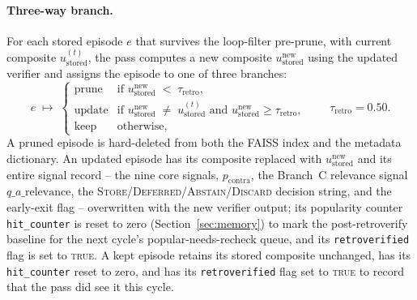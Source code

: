 \paragraph{Three-way branch.}
For each stored episode $e$ that survives the loop-filter pre-prune, with current composite $u_{\text{stored}}^{(t)}$, the pass computes a new composite $u_{\text{stored}}^{\text{new}}$ using the updated verifier and assigns the episode to one of three branches:
\begin{equation}
e \;\longmapsto\;
\begin{cases}
\text{prune} & \text{if } u_{\text{stored}}^{\text{new}} \;<\; \tau_{\text{retro}}, \\[3pt]
\text{update} & \text{if } u_{\text{stored}}^{\text{new}} \;\neq\; u_{\text{stored}}^{(t)} \text{ and } u_{\text{stored}}^{\text{new}} \geq \tau_{\text{retro}}, \\[3pt]
\text{keep} & \text{otherwise},
\end{cases}
\qquad \tau_{\text{retro}} = 0.50.
\label{eq:retro-branch}
\end{equation}
A pruned episode is hard-deleted from both the FAISS index and the metadata dictionary. An updated episode has its composite replaced with $u_{\text{stored}}^{\text{new}}$ and its entire signal record -- the nine core signals, $p_{\text{contra}}$, the Branch~C relevance signal $q\_a\_\text{relevance}$, the \textsc{Store}/\textsc{Deferred}/\textsc{Abstain}/\textsc{Discard} decision string, and the early-exit flag -- overwritten with the new verifier output; its popularity counter \texttt{hit\_counter} is reset to zero (Section~\ref{sec:memory}) to mark the post-retroverify baseline for the next cycle's popular-needs-recheck queue, and its \texttt{retroverified} flag is set to \textsc{true}. A kept episode retains its stored composite unchanged, has its \texttt{hit\_counter} reset to zero, and has its \texttt{retroverified} flag set to \textsc{true} to record that the pass did see it this cycle.

